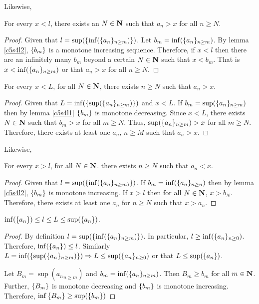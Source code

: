 Likewise,
\begin{lem}\label{c5s4l4}
For every $x < l$, there exists an $N \in \mathbf{N}$ such that $a_n > x$ for
all $n \ge N$.
\end{lem}
\begin{proof}
Given that $l = \sup(\{\inf(\{a_n\}_{n \ge m})\})$. Let $b_m = \inf(\{a_n\}_{n \ge m})$. By lemma \ref{c5s4l2}, $\{b_m\}$ is a monotone
increasing sequence. Therefore, if $x < l$ then there are an infinitely many
$b_m$ beyond a certain $N \in \mathbf{N}$ such that $x < b_m$. That is $x < \inf(
\{a_n\}_{n \ge m})$ or that $a_n > x$ for all $n \ge N$.
\end{proof}

\begin{lem}\label{c5s4l5}
For every $x < L$, for all $N \in \mathbf{N}$, there exists $n \ge N$ such that
$a_n > x$.
\end{lem}
\begin{proof}
Given that $L = \inf(\{\sup(\{a_n\}_{n \ge m})\})$ and $x < L$. If $b_m
= \sup(\{a_n\}_{n \ge m})$ then by lemma \ref{c5s4l1} $\{b_m\}$ is 
monotone decreasing. Since $x < L$, there exists $N \in \mathbf{N}$ such that $
b_m > x$ for all $m \ge N$. Thus, $\sup(\{a_n\}_{n \ge m}) > x$ for all
$m \ge N$. Therefore, there exists at least one $a_n$, $n \ge M$ such that
$a_n > x$.
\end{proof}

Likewise,
\begin{lem}\label{c5s4l6}
For every $x > l$, for all $N \in \mathbf{N}$. there exists $n \ge N$ such that 
$a_n < x$.
\end{lem}
\begin{proof}
Given that $l = \sup(\{\inf(\{a_n\}_{n \ge m)}\})$. If $b_m = \inf(\{
a_n\}_{n \ge n})$ then by lemma \ref{c5s4l2}, $\{b_m\}$ is monotone 
increasing. If $x > l$ then for all $N \in \mathbf{N}$, $x > b_N$. Therefore,
there exists at least one $a_n$ for $n \ge N$ such that $x > a_n$.
\end{proof}

\begin{lem}\label{c5s4l7}
$\inf(\{a_n\}) \le l \le L \le \sup(\{a_n\})$.
\end{lem}
\begin{proof}
By definition $l = \sup(\{\inf(\{a_n\}_{n \ge m})\})$. In particular,
$l \ge \inf(\{a_n\}_{n \ge 0})$. Therefore, $\inf(\{a_n\}) \le l$. 
Similarly $L = \inf(\{\sup(\{a_n\}_{n \ge m})\}) \Rightarrow L \le 
\sup(\{a_n\}_{n \ge 0})$ or that $L \le \sup(\{a_n\})$. 

Let $B_m = \sup({a_n}_{n \ge m})$ and $b_m = \inf(\{a_n\}_{n \ge m})$. 
Then $B_m \ge b_m$ for all $m \in \mathbf{N}$. Further, $\{B_m\}$ is monotone
decreasing and $\{b_m\}$ is monotone increasing. Therefore, 
$\inf{\{B_m\}} \ge \sup(\{b_m\})$
\end{proof}

